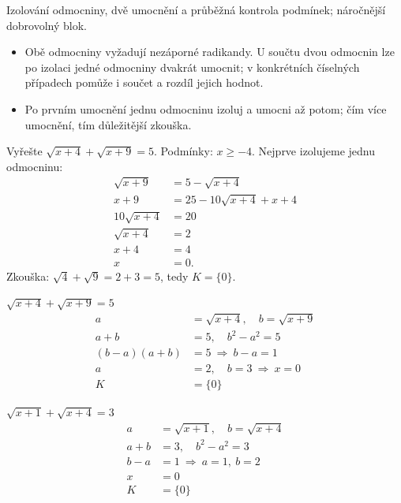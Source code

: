 \documentclass[11pt,a4paper]{article}
\begin{document}
Izolování odmocniny, dvě umocnění a průběžná kontrola podmínek; náročnější dobrovolný blok.
\begin{itemize}
\item Obě odmocniny vyžadují nezáporné radikandy. U součtu dvou odmocnin lze po izolaci jedné odmocniny dvakrát umocnit; v konkrétních číselných případech pomůže i součet a rozdíl jejich hodnot.
\item Po prvním umocnění jednu odmocninu izoluj a umocni až potom; čím více umocnění, tím důležitější zkouška.
\end{itemize}
\begin{prikladReseniBox}[title={Příklad 1}]
Vyřešte $\sqrt{x+4}+\sqrt{x+9}=5$.
\tcblower
Podmínky: $x\ge-4$. Nejprve izolujeme jednu odmocninu:
\[
\begin{aligned}
\sqrt{x+9}&=5-\sqrt{x+4}\\
x+9&=25-10\sqrt{x+4}+x+4\\
10\sqrt{x+4}&=20\\
\sqrt{x+4}&=2\\
x+4&=4\\
x&=0.
\end{aligned}
\]
Zkouška: $\sqrt4+\sqrt9=2+3=5$, tedy $K=\{0\}$.
\end{prikladReseniBox}
\begin{prikladReseniBox}[title={Příklad 2}]
$\sqrt{x+4}+\sqrt{x+9}=5$
\tcblower
\[
\begin{aligned}
a&=\sqrt{x+4},\quad b=\sqrt{x+9}\\[2pt]
a+b&=5,\quad b^2-a^2=5\\[2pt]
(b-a)(a+b)&=5\ \Rightarrow\ b-a=1\\[2pt]
a&=2,\quad b=3\ \Rightarrow\ x=0\\[2pt]
K&=\{0\}
\end{aligned}
\]
\end{prikladReseniBox}
\begin{prikladReseniBox}[title={Příklad 3}]
$\sqrt{x+1}+\sqrt{x+4}=3$
\tcblower
\[
\begin{aligned}
a&=\sqrt{x+1},\quad b=\sqrt{x+4}\\[2pt]
a+b&=3,\quad b^2-a^2=3\\[2pt]
b-a&=1\ \Rightarrow\ a=1,\ b=2\\[2pt]
x&=0\\[2pt]
K&=\{0\}
\end{aligned}
\]
\end{prikladReseniBox}
\end{document}
